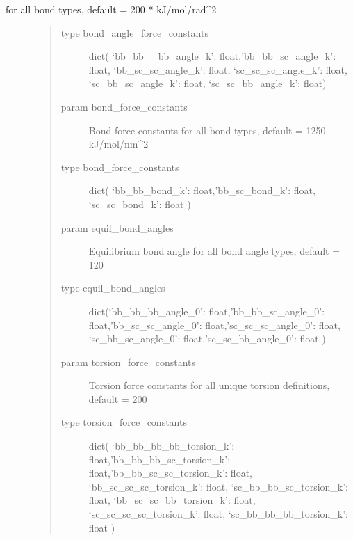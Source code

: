 \documentclass[letterpaper,12pt,english,openany,oneside]{sphinxmanual}
\begin{document}
\begin{fulllineitems}
\begin{quote}
\begin{quote}
\begin{description}

\end{description}\end{quote}
\end{quote}
\begin{description}
\item[{for all bond types, default = 200 * kJ/mol/rad\textasciicircum{}2}] \leavevmode\begin{quote}\begin{description}
\item[{type bond\_angle\_force\_constants}] \leavevmode
dict( ‘bb\_bb\_\_bb\_angle\_k’: float,’bb\_bb\_sc\_angle\_k’: float, ‘bb\_sc\_sc\_angle\_k’: float, ‘sc\_sc\_sc\_angle\_k’: float, ‘sc\_bb\_sc\_angle\_k’: float, ‘sc\_sc\_bb\_angle\_k’: float)

\item[{param bond\_force\_constants}] \leavevmode
Bond force constants for all bond types, default = 1250 kJ/mol/nm\textasciicircum{}2

\item[{type bond\_force\_constants}] \leavevmode
dict( ‘bb\_bb\_bond\_k’: float,’bb\_sc\_bond\_k’: float, ‘sc\_sc\_bond\_k’: float )

\item[{param equil\_bond\_angles}] \leavevmode
Equilibrium bond angle for all bond angle types, default = 120

\item[{type equil\_bond\_angles}] \leavevmode
dict(‘bb\_bb\_bb\_angle\_0’: float,’bb\_bb\_sc\_angle\_0’: float,’bb\_sc\_sc\_angle\_0’: float,’sc\_sc\_sc\_angle\_0’: float, ‘sc\_bb\_sc\_angle\_0’: float,’sc\_sc\_bb\_angle\_0’: float )

\item[{param torsion\_force\_constants}] \leavevmode
Torsion force constants for all unique torsion definitions, default = 200

\item[{type torsion\_force\_constants}] \leavevmode
dict( ‘bb\_bb\_bb\_bb\_torsion\_k’: float,’bb\_bb\_bb\_sc\_torsion\_k’: float,’bb\_bb\_sc\_sc\_torsion\_k’: float, ‘bb\_sc\_sc\_sc\_torsion\_k’: float, ‘sc\_bb\_bb\_sc\_torsion\_k’: float, ‘bb\_sc\_sc\_bb\_torsion\_k’: float, ‘sc\_sc\_sc\_sc\_torsion\_k’: float,  ‘sc\_bb\_bb\_bb\_torsion\_k’: float )


\end{description}
\end{quote}
\end{description}
\end{fulllineitems}
\end{document}
